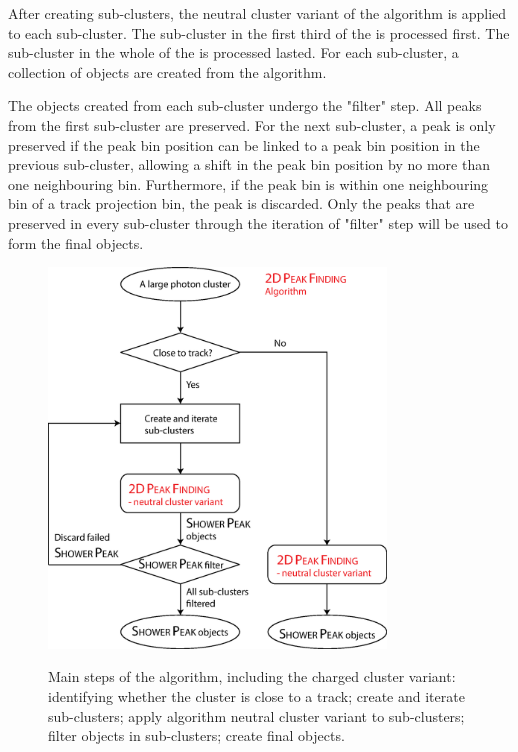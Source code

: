 After creating sub-clusters, the neutral cluster variant of the  \peakFinding algorithm is applied to each sub-cluster.  The sub-cluster in the first third of the \ECAL is processed first. The sub-cluster in the whole of the \ECAL is processed lasted. For each sub-cluster, a collection of \ShowerPeak objects are created from the  \peakFinding algorithm.

The \ShowerPeak objects created from each sub-cluster undergo the "\ShowerPeak filter" step. All peaks from the first sub-cluster are preserved. For the next sub-cluster, a peak  is only preserved if the peak bin position can be linked to a peak bin position in the previous sub-cluster, allowing a shift in the peak bin position by no more than one neighbouring bin. Furthermore, if the peak bin is within one neighbouring bin of a track projection bin, the peak is discarded. Only the peaks that are preserved in every sub-cluster through the iteration of "\ShowerPeak filter" step will be used to form the final \ShowerPeak objects.


\begin{figure}[tbph]
\centering
{\includegraphics[width=0.8\textwidth]{photon/2DpeakFindingTrack}}
\caption[Flow chart for \peakFinding algorithm.]
{Main steps of the  \peakFinding algorithm, including the charged cluster variant: identifying whether the cluster is close to a track; create and iterate sub-clusters; apply \peakFinding algorithm neutral cluster variant to sub-clusters; filter \ShowerPeak objects in sub-clusters; create final \ShowerPeak objects.}
\label{fig:photonPeakFindingFlow}
\end{figure}


